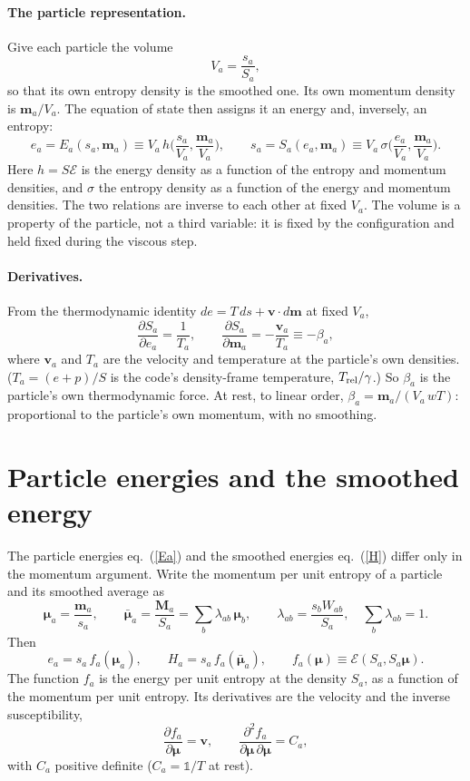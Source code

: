 \documentclass[11pt,aps,preprint,nofootinbib,superscriptaddress,tightenlines]{revtex4-2}
\def\st{\begin{equation}}
\def\stp{\end{equation}}
\def\Eq#1{eq.~(\ref{#1})}
\newcommand{\one}{\mathds{1}}
\let\oldparagraph\paragraph
\renewcommand{\paragraph}{\par\bigskip\oldparagraph}
\begin{document}
\paragraph{The particle representation.}  Give each particle the volume
\st
V_a=\frac{s_a}{S_a},
\stp
so that its own entropy density is the smoothed one.  Its own momentum density
is $\bm m_a/V_a$.  The equation of state then assigns it an energy and,
inversely, an entropy:
\st
e_a=E_a(s_a,\bm m_a)\equiv V_a\,h\Big(\frac{s_a}{V_a},\frac{\bm m_a}{V_a}\Big),\qquad
s_a=S_a(e_a,\bm m_a)\equiv V_a\,\sigma\Big(\frac{e_a}{V_a},\frac{\bm m_a}{V_a}\Big).
\label{Ea}
\stp
Here $h=S\mathcal E$ is the energy density as a function of the entropy and
momentum densities, and $\sigma$ the entropy density as a function of the energy
and momentum densities.  The two relations are inverse to each other at fixed
$V_a$.  The volume is a property of the particle, not a third variable: it is
fixed by the configuration and held fixed during the viscous step.

\paragraph{Derivatives.}  From the thermodynamic identity
$de=T\,ds+\bm v\cdot d\bm m$ at fixed $V_a$,
\st
\frac{\partial S_a}{\partial e_a}=\frac1{T_a},\qquad
\frac{\partial S_a}{\partial\bm m_a}=-\frac{\bm v_a}{T_a}\equiv-\beta_a ,
\label{betapt}
\stp
where $\bm v_a$ and $T_a$ are the velocity and temperature at the particle's
own densities.  ($T_a=(e+p)/S$ is the code's density-frame temperature,
$T_{\rm rel}/\gamma$.)  So $\beta_a$ is the particle's own thermodynamic force.
At rest, to linear order, $\beta_a=\bm m_a/(V_a\,wT)$: proportional to the
particle's own momentum, with no smoothing.

\section{Particle energies and the smoothed energy}
\label{sec:energies}

The particle energies \Eq{Ea} and the smoothed energies \Eq{H} differ only in
the momentum argument.  Write the momentum per unit entropy of a particle and
its smoothed average as
\st
\bm\mu_a=\frac{\bm m_a}{s_a},\qquad
\bar{\bm\mu}_a=\frac{\bm M_a}{S_a}=\sum_b\lambda_{ab}\,\bm\mu_b,\qquad
\lambda_{ab}=\frac{s_bW_{ab}}{S_a},\quad\sum_b\lambda_{ab}=1 .
\stp
Then
\st
e_a=s_a\,f_a(\bm\mu_a),\qquad H_a=s_a\,f_a(\bar{\bm\mu}_a),\qquad
f_a(\bm\mu)\equiv\mathcal E(S_a,S_a\bm\mu) .
\stp
The function $f_a$ is the energy per unit entropy at the density $S_a$, as a
function of the momentum per unit entropy.  Its derivatives are the velocity
and the inverse susceptibility,
\st
\frac{\partial f_a}{\partial\bm\mu}=\bm v,\qquad
\frac{\partial^2f_a}{\partial\bm\mu\,\partial\bm\mu}=C_a ,
\stp
with $C_a$ positive definite ($C_a=\one/T$ at rest).
\end{document}
